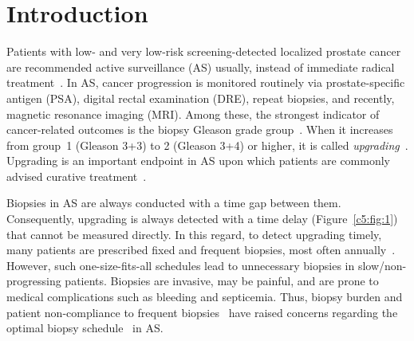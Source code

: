 \section{Introduction}
\label{c5:introduction}
Patients with low- and very low-risk screening-detected localized prostate cancer are recommended active surveillance (AS) usually, instead of immediate radical treatment~\citep{briganti2018active}. In AS, cancer progression is monitored routinely via prostate-specific antigen (PSA), digital rectal examination (DRE), repeat biopsies, and recently, magnetic resonance imaging (MRI). Among these, the strongest indicator of cancer-related outcomes is the biopsy Gleason grade group~\citep{epsteinGG2014}. When it increases from group~1 (Gleason 3+3) to 2 (Gleason 3+4) or higher, it is called \emph{upgrading}~\citep{bruinsma2017expert}. Upgrading is an important endpoint in AS upon which patients are commonly advised curative treatment~\citep{bul2013active}.

Biopsies in AS are always conducted with a time gap between them. Consequently, upgrading is always detected with a time delay (Figure~\ref{c5:fig:1}) that cannot be measured directly. In this regard, to detect upgrading timely, many patients are prescribed fixed and frequent biopsies, most often annually~\cite{loeb2014heterogeneity}. However, such one-size-fits-all schedules lead to unnecessary biopsies in slow/non-progressing patients. Biopsies are invasive, may be painful, and are prone to medical complications such as bleeding and septicemia\citep{loeb2013systematic}. Thus, biopsy burden and patient non-compliance to frequent biopsies~\citep{bokhorst2015compliance} have raised concerns regarding the optimal biopsy schedule~\citep{inoue2018comparative, bratt2013study} in AS.

